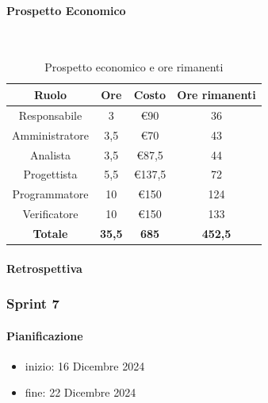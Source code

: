\documentclass{article}
\begin{document}
                \paragraph{Prospetto Economico}\mbox{}\\
                \begin{table}[H]
                    \centering
                    \begin{tabular}{|c|c|c|c|}
                    \hline
                    \textbf{Ruolo}  & \textbf{Ore}  & \textbf{Costo} & \textbf{Ore rimanenti} \\ \hline
                    Responsabile    & 3             & €90            & 36                     \\ \hline
                    Amministratore  & 3,5           & €70            & 43                   \\ \hline
                    Analista        & 3,5           & €87,5          & 44                   \\ \hline
                    Progettista     & 5,5           & €137,5         & 72                   \\ \hline
                    Programmatore   & 10            & €150           & 124                    \\ \hline
                    Verificatore    & 10            & €150           & 133                    \\ \hline
                    \textbf{Totale} & \textbf{35,5} & \textbf{685}   & \textbf{452,5}         \\ \hline
                    \end{tabular}
                    \caption{Prospetto economico e ore rimanenti}
                \end{table}

                \paragraph{Retrospettiva}
            \subsubsection{Sprint 7}
                \paragraph{Pianificazione}
                \begin{itemize}
                    \item inizio: 16 Dicembre 2024
                    \item fine: 22 Dicembre 2024
                \end{itemize}
\end{document}
